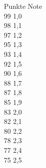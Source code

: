 \documentclass[addpoints,a4paper,ngerman,10pt,answers]{exam}
\begin{document}
\begin{minipage}{0.20\textwidth}
Punkte\hspace{.15cm} Note\\\vspace{.3cm}
99 \hspace{.8cm} 1,0 \\\vspace{.1cm}
98 \hspace{.8cm} 1,1 \\\vspace{.1cm}
97 \hspace{.8cm} 1,2 \\\vspace{.1cm}
95 \hspace{.8cm} 1,3 \\\vspace{.1cm}
93 \hspace{.8cm} 1,4 \\\vspace{.1cm}
92 \hspace{.8cm} 1,5 \\\vspace{.1cm}
90 \hspace{.8cm} 1,6 \\\vspace{.1cm}
88 \hspace{.8cm} 1,7 \\\vspace{.1cm}
87 \hspace{.8cm} 1,8 \\\vspace{.1cm}
85 \hspace{.8cm} 1,9 \\\vspace{.1cm}
83 \hspace{.8cm} 2,0 \\\vspace{.1cm}
82 \hspace{.8cm} 2,1 \\\vspace{.1cm}
80 \hspace{.8cm} 2,2 \\\vspace{.1cm}
78 \hspace{.8cm} 2,3 \\\vspace{.1cm}
77 \hspace{.8cm} 2,4 \\\vspace{.1cm}
75 \hspace{.8cm} 2,5 \\\vspace{.1cm}

\end{minipage}
\end{document}

